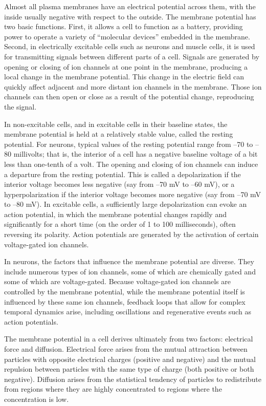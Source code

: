 Almost all plasma membranes have an electrical potential across them, with the inside usually negative with respect to the outside. The membrane potential has two basic functions. First, it allows a cell to function as a battery, providing power to operate a variety of ``molecular devices'' embedded in the membrane. Second, in electrically excitable cells such as neurons and muscle cells, it is used for transmitting signals between different parts of a cell. Signals are generated by opening or closing of ion channels at one point in the membrane, producing a local change in the membrane potential. This change in the electric field can quickly affect adjacent and more distant ion channels in the membrane. Those ion channels can then open or close as a result of the potential change, reproducing the signal.

In non-excitable cells, and in excitable cells in their baseline states, the membrane potential is held at a relatively stable value, called the resting potential. For neurons, typical values of the resting potential range from --70 to --80 millivolts; that is, the interior of a cell has a negative baseline voltage of a bit less than one-tenth of a volt. The opening and closing of ion channels can induce a departure from the resting potential. This is called a depolarization if the interior voltage becomes less negative (say from --70 mV to --60 mV), or a hyperpolarization if the interior voltage becomes more negative (say from --70 mV to --80 mV). In excitable cells, a sufficiently large depolarization can evoke an action potential, in which the membrane potential changes rapidly and significantly for a short time (on the order of 1 to 100 milliseconds), often reversing its polarity. Action potentials are generated by the activation of certain voltage-gated ion channels.

In neurons, the factors that influence the membrane potential are diverse. They include numerous types of ion channels, some of which are chemically gated and some of which are voltage-gated. Because voltage-gated ion channels are controlled by the membrane potential, while the membrane potential itself is influenced by these same ion channels, feedback loops that allow for complex temporal dynamics arise, including oscillations and regenerative events such as action potentials.

The membrane potential in a cell derives ultimately from two factors: electrical force and diffusion. Electrical force arises from the mutual attraction between particles with opposite electrical charges (positive and negative) and the mutual repulsion between particles with the same type of charge (both positive or both negative). Diffusion arises from the statistical tendency of particles to redistribute from regions where they are highly concentrated to regions where the concentration is low.

